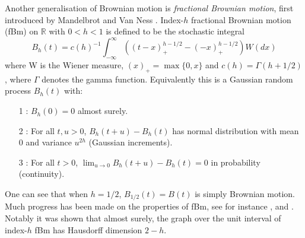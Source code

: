 Another generalisation of Brownian motion is \emph{fractional Brownian motion}, first introduced by Mandelbrot and Van Ness \cite{MVN}. Index-$h$ fractional Brownian motion (fBm) on $\mathbb{R}$ with $0<h<1$ is defined to be the stochastic integral 
\[
B_h (t) = c(h)^{-1} \int_{-\infty}^\infty \left(\left( t-x \right)_+^{h-1/2} - (-x)_+^{h-1/2} \right)W(dx)
\]
where W is the Wiener measure, $(x)_+ = \max\{0,x\}$ and $c(h) = \Gamma(h+1/2)$, where $\Gamma$ denotes the gamma function. Equivalently this is a Gaussian random process $B_h(t)$ with:
\begin{itemize}
	\item[1]: $B_h(0)=0$ almost surely.
	\item[2]: For all $t,u>0$, $B_h(t+u)-B_h(t)$ has normal distribution with mean 0 and variance $u^{2h}$ (Gaussian increments).
	\item[3]: For all $t>0$, $\lim_{u\to 0} B_h(t+u)-B_h(t)=0$ in probability (continuity).
\end{itemize}
One can see that when $h=1/2$, $B_{1/2}(t) = B(t)$ is simply Brownian motion. Much progress has been made on the properties of fBm, see for instance \cite{Ad},\cite{Ka} and \cite{Fa2}. Notably it was shown that almost surely, the graph over the unit interval of index-$h$ fBm has Hausdorff dimension $2-h$. 


